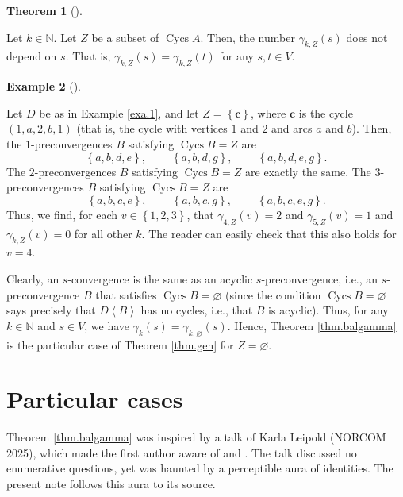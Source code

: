 \documentclass[numbers=enddot,12pt,final,onecolumn,notitlepage]{scrartcl}%
\theoremstyle{definition}
\newtheorem{theo}{Theorem}[section]
\newenvironment{theorem}[1][]
{\begin{theo}[#1]\begin{leftbar}}
{\end{leftbar}\end{theo}}
\newtheorem{exam}[theo]{Example}
\newenvironment{example}[1][]
{\begin{exam}[#1]\begin{leftbar}}
{\end{leftbar}\end{exam}}
\theoremstyle{plainsl}
\begin{document}
\begin{theorem}
\label{thm.gen}Let $k\in\mathbb{N}$. Let $Z$ be a subset of
$\operatorname*{Cycs}A$. Then, the number $\gamma_{k,Z}\left(  s\right)  $
does not depend on $s$. That is, $\gamma_{k,Z}\left(  s\right)  =\gamma
_{k,Z}\left(  t\right)  $ for any $s,t\in V$.
\end{theorem}


\begin{example}
\label{exa.1Z}Let $D$ be as in Example \ref{exa.1}, and let $Z=\left\{
\mathbf{c}\right\}  $, where $\mathbf{c}$ is the cycle $\left(
1,a,2,b,1\right)  $ (that is, the cycle with vertices $1$ and $2$ and arcs $a$
and $b$). Then, the $1$-preconvergences $B$ satisfying $\operatorname*{Cycs}%
B=Z$ are%
\[
\left\{  a,b,d,e\right\}  ,\ \ \ \ \ \ \ \ \ \ \left\{  a,b,d,g\right\}
,\ \ \ \ \ \ \ \ \ \ \left\{  a,b,d,e,g\right\}  .
\]
The $2$-preconvergences $B$ satisfying $\operatorname*{Cycs}B=Z$ are exactly
the same. The $3$-preconvergences $B$ satisfying $\operatorname*{Cycs}B=Z$
are
\[
\left\{  a,b,c,e\right\}  ,\ \ \ \ \ \ \ \ \ \ \left\{  a,b,c,g\right\}
,\ \ \ \ \ \ \ \ \ \ \left\{  a,b,c,e,g\right\}  .
\]
Thus, we find, for each $v\in\left\{  1,2,3\right\}  $, that $\gamma
_{4,Z}\left(  v\right)  =2$ and $\gamma_{5,Z}\left(  v\right)  =1$ and
$\gamma_{k,Z}\left(  v\right)  =0$ for all other $k$. The reader can easily
check that this also holds for $v=4$.
\end{example}

Clearly, an $s$-convergence is the same as an acyclic $s$-preconvergence,
i.e., an $s$-preconvergence $B$ that satisfies $\operatorname*{Cycs}%
B=\varnothing$ (since the condition $\operatorname*{Cycs}B=\varnothing$ says
precisely that $D\left\langle B\right\rangle $ has no cycles, i.e., that $B$
is acyclic). Thus, for any $k\in\mathbb{N}$ and $s\in V$, we have $\gamma
_{k}\left(  s\right)  =\gamma_{k,\varnothing}\left(  s\right)  $. Hence,
Theorem \ref{thm.balgamma} is the particular case of Theorem \ref{thm.gen} for
$Z=\varnothing$.

\section{\label{sec.partic}Particular cases}

Theorem \ref{thm.balgamma} was inspired by a talk of Karla Leipold (NORCOM
2025), which made the first author aware of \cite[Lemma 4.1]{LeiVal24} and
\cite[\S 3.1]{PerPha15}. The talk discussed no enumerative questions, yet was
haunted by a perceptible aura of identities. The present note follows this
aura to its source.
\end{document}
